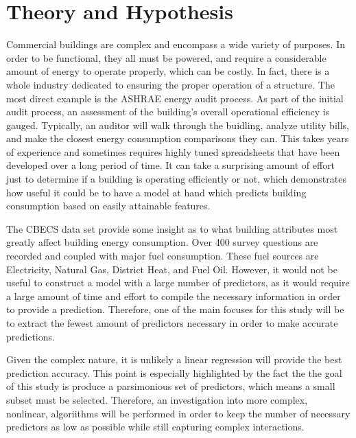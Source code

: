 \section*{Theory and Hypothesis}
\label{sec:theory_and_hypothesis}

Commercial buildings are complex and encompass a wide variety of purposes. In order to be functional, they all must be powered, and require a considerable amount of energy to operate properly, which can be costly.  In fact, there is a whole industry dedicated to ensuring the proper operation of a structure.  The most direct example is the ASHRAE energy audit process.  As part of the initial audit process, an assessment of the building's overall operational efficiency is gauged.  Typically, an auditor will walk through the buidling, analyze utility bills, and make the closest energy consumption comparisons they can.  This takes years of experience and sometimes requires highly tuned spreadsheets that have been developed over a long period of time.  It can take a surprising amount of effort just to determine if a building is operating efficiently or not, which demonstrates how useful it could be to have a model at hand which predicts building consumption based on easily attainable features.

The CBECS data set provide some insight as to what building attributes most greatly affect building energy consumption.  Over 400 survey questions are recorded and coupled with major fuel consumption.  These fuel sources are Electricity, Natural Gas, District Heat, and Fuel Oil.  However, it would not be useful to construct a model with a large number of predictors, as it would require a large amount of time and effort to compile the necessary information in order to provide a prediction.  Therefore, one of the main focuses for this study will be to extract the fewest amount of predictors necessary in order to make accurate predictions.  

Given the complex nature, it is unlikely a linear regression will provide the best prediction accuracy.  This point is especially highlighted by the fact the the goal of this study is produce a parsimonious set of predictors, which means a small subset must be selected.  Therefore, an investigation into more complex, nonlinear, algoriithms will be performed in order to keep the number of necessary predictors as low as possible while still capturing complex interactions.